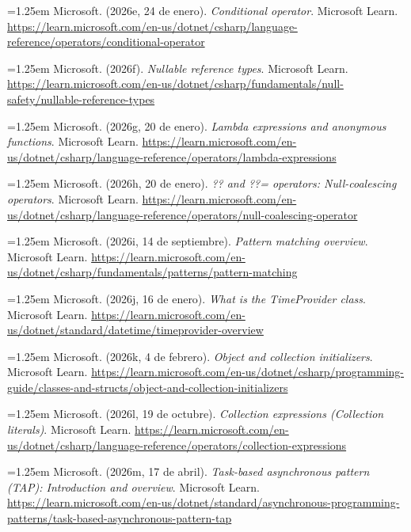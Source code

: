 \smallskip
\noindent\hangindent=1.25em Microsoft. (2026e, 24 de enero). \textit{Conditional operator}. Microsoft Learn. \url{https://learn.microsoft.com/en-us/dotnet/csharp/language-reference/operators/conditional-operator}

\smallskip
\noindent\hangindent=1.25em Microsoft. (2026f). \textit{Nullable reference types}. Microsoft Learn. \url{https://learn.microsoft.com/en-us/dotnet/csharp/fundamentals/null-safety/nullable-reference-types}

\smallskip
\noindent\hangindent=1.25em Microsoft. (2026g, 20 de enero). \textit{Lambda expressions and anonymous functions}. Microsoft Learn. \url{https://learn.microsoft.com/en-us/dotnet/csharp/language-reference/operators/lambda-expressions}

\smallskip
\noindent\hangindent=1.25em Microsoft. (2026h, 20 de enero). \textit{?? and ??= operators: Null-coalescing operators}. Microsoft Learn. \url{https://learn.microsoft.com/en-us/dotnet/csharp/language-reference/operators/null-coalescing-operator}

\smallskip
\noindent\hangindent=1.25em Microsoft. (2026i, 14 de septiembre). \textit{Pattern matching overview}. Microsoft Learn. \url{https://learn.microsoft.com/en-us/dotnet/csharp/fundamentals/patterns/pattern-matching}

\smallskip
\noindent\hangindent=1.25em Microsoft. (2026j, 16 de enero). \textit{What is the TimeProvider class}. Microsoft Learn. \url{https://learn.microsoft.com/en-us/dotnet/standard/datetime/timeprovider-overview}

\smallskip
\noindent\hangindent=1.25em Microsoft. (2026k, 4 de febrero). \textit{Object and collection initializers}. Microsoft Learn. \url{https://learn.microsoft.com/en-us/dotnet/csharp/programming-guide/classes-and-structs/object-and-collection-initializers}

\smallskip
\noindent\hangindent=1.25em Microsoft. (2026l, 19 de octubre). \textit{Collection expressions (Collection literals)}. Microsoft Learn. \url{https://learn.microsoft.com/en-us/dotnet/csharp/language-reference/operators/collection-expressions}

\smallskip
\noindent\hangindent=1.25em Microsoft. (2026m, 17 de abril). \textit{Task-based asynchronous pattern (TAP): Introduction and overview}. Microsoft Learn. \url{https://learn.microsoft.com/en-us/dotnet/standard/asynchronous-programming-patterns/task-based-asynchronous-pattern-tap}

